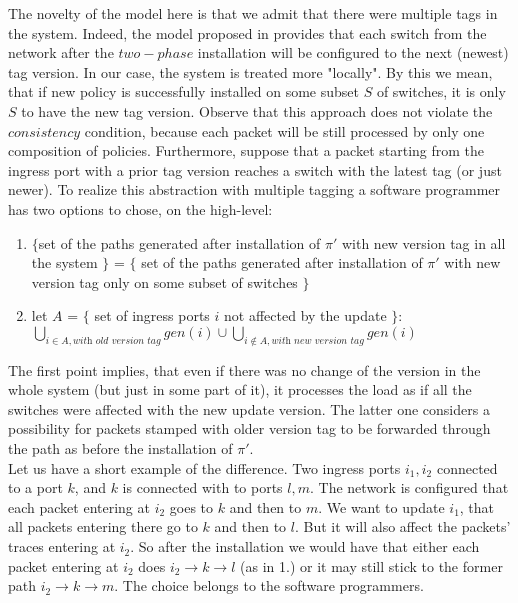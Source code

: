\documentclass{article}
\theoremstyle{remark}
\begin{document}
The novelty of the model here is that we admit that there were multiple tags in the system. Indeed, the model proposed in \cite{Reitblatt:2012:ANU:2342356.2342427} provides that each switch from the network after the $two-phase$ installation will be configured to the next (newest) tag version. In our case, the system is treated more "locally". By this we mean, that if new policy is successfully installed on some subset $S$ of switches, it is only $S$ to have the new tag version. Observe that this approach does not violate the $consistency$ condition, because each packet will be still processed by only one composition of policies. Furthermore, suppose that a packet starting from the ingress port with a prior tag version reaches a switch with the latest tag (or just newer). To realize this abstraction with multiple tagging a software programmer has two options to chose, on the high-level:
\begin{enumerate}
\item $\lbrace$set of the paths generated after installation of $\pi'$ with new version tag in all the system $\rbrace$ = $\lbrace$ set of the paths generated after installation of $\pi'$ with new version tag only on some subset of switches $\rbrace$
\item let $A$ = $\lbrace$ set of ingress ports $i$ not affected by the update $\rbrace$:\\
$\bigcup\limits_{i\in A,\textit{with old version tag}} gen(i)\cup\bigcup\limits_{i\notin A, \textit{with new version tag}}gen(i)$
\end{enumerate}
The first point implies, that even if there was no change of the version in the whole system (but just in some part of it), it processes the load as if all the switches were affected with the new update version. The latter one considers a possibility for packets stamped with older version tag to be forwarded through the path as before the installation of $\pi'$.\\
Let us have a short example of the difference. Two ingress ports $i_1,i_2$ connected to a port $k$, and $k$ is connected with to ports $l,m$. The network is configured that each packet entering at $i_2$ goes to $k$ and then to $m$. We want to update $i_1$, that all packets entering there go to $k$ and then to $l$. But it will also affect the packets' traces entering at $i_2$. So after the installation we would have that either each packet entering at $i_2$ does $i_2\rightarrow k\rightarrow l$ (as in 1.) or it may still stick to the former path $i_2\rightarrow k\rightarrow m$. The choice belongs to the software programmers.\\
\end{document}
